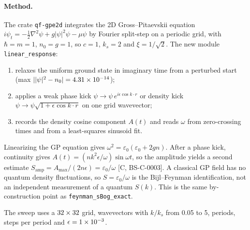 \documentclass[11pt]{article}
\theoremstyle{remark}
\newcommand{\tier}[1]{\textsf{[#1]}}
\newcommand{\lean}[1]{\texttt{#1}}
\newcommand{\ks}{k_s}
\begin{document}
\paragraph{Method.} The crate \texttt{qf-gpe2d} integrates the 2D Gross--Pitaevskii equation
$i\psi_t=-\tfrac12\nabla^2\psi+g|\psi|^2\psi-\mu\psi$ by Fourier split-step on a periodic grid, with $\hbar=m=1$,
$n_0=g=1$, so $c=1$, $\ks=2$ and $\xi=1/\sqrt2$. The new module \texttt{linear\_response}:
\begin{enumerate}
\item relaxes the uniform ground state in imaginary time from a perturbed start (max $||\psi|^2-n_0|=4.31\times10^{-14}$);
\item applies a weak phase kick $\psi\to\psi\,e^{i\epsilon\cos k\cdot r}$ or density kick
$\psi\to\psi\sqrt{1+\epsilon\cos k\cdot r}$ on one grid wavevector;
\item records the density cosine component $A(t)$ and reads $\omega$ from zero-crossing times and from a
least-squares sinusoid fit.
\end{enumerate}
Linearizing the GP equation gives $\omega^2=\varepsilon_0(\varepsilon_0+2gn)$. After a phase kick, continuity gives
$A(t)=(nk^2\epsilon/\omega)\sin\omega t$, so the amplitude yields a second estimate $S_\mathrm{amp}=A_\mathrm{max}/(2n
\epsilon)=\varepsilon_0/\omega$ \tier{C, BS-C-0003}. A classical GP field has no quantum density fluctuations, so
$S=\varepsilon_0/\omega$ is the Bijl--Feynman identification, not an independent measurement of a quantum $S(k)$.
This is the same by-construction point as \lean{feynman\_sBog\_exact}.

The sweep uses a $32\times32$ grid, \NSweep{} wavevectors with $k/\ks$ from 0.05 to 5, \Periods{} periods,
\SPP{} steps per period and $\epsilon=1\times10^{-3}$.
\end{document}
